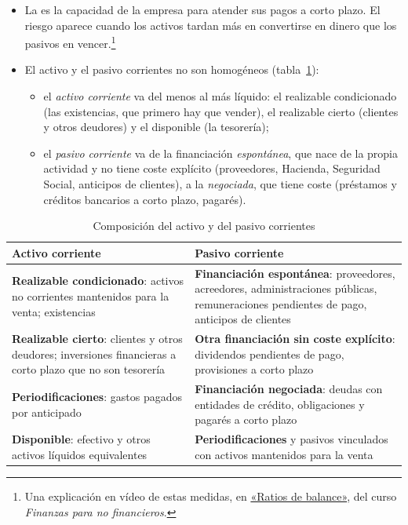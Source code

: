 \documentclass[11pt]{article}
\begin{document}
\begin{itemize}
\item La  es la capacidad de la empresa para atender sus pagos a corto plazo. El riesgo aparece cuando los activos tardan más en convertirse en dinero que los pasivos en vencer.\footnote{Una explicación en vídeo de estas medidas, en \href{https://youtu.be/1lgrALWCkMs}{«Ratios de balance»}, del curso \emph{Finanzas para no financieros}\nocite{GonzalezGarcia2012Ratios}.}
\item El activo y el pasivo corrientes no son homogéneos (tabla~\ref{tab:composicion-corriente}):
  \begin{itemize}
  \item el \emph{activo corriente} va del menos al más líquido: el realizable condicionado (las existencias, que primero hay que vender), el realizable cierto (clientes y otros deudores) y el disponible (la tesorería);
  \item el \emph{pasivo corriente} va de la financiación \emph{espontánea}, que nace de la propia actividad y no tiene coste explícito (proveedores, Hacienda, Seguridad Social, anticipos de clientes), a la \emph{negociada}, que tiene coste (préstamos y créditos bancarios a corto plazo, pagarés).
  \end{itemize}
\end{itemize}

\begin{table}[H]
\centering
\caption{Composición del activo y del pasivo corrientes}\label{tab:composicion-corriente}
\small
\renewcommand{\arraystretch}{1.2}
\begin{tabular}{>{\raggedright\arraybackslash}m{6.9cm}>{\raggedright\arraybackslash}m{6.9cm}}
\toprule
\rowcolor{tceeazulpalido}\textbf{Activo corriente} & \textbf{Pasivo corriente} \\
\midrule
\textbf{Realizable condicionado}: activos no corrientes mantenidos para la venta; existencias & \textbf{Financiación espontánea}: proveedores, acreedores, administraciones públicas, remuneraciones pendientes de pago, anticipos de clientes \\
\textbf{Realizable cierto}: clientes y otros deudores; inversiones financieras a corto plazo que no son tesorería & \textbf{Otra financiación sin coste explícito}: dividendos pendientes de pago, provisiones a corto plazo \\
\textbf{Periodificaciones}: gastos pagados por anticipado & \textbf{Financiación negociada}: deudas con entidades de crédito, obligaciones y pagarés a corto plazo \\
\textbf{Disponible}: efectivo y otros activos líquidos equivalentes & \textbf{Periodificaciones} y pasivos vinculados con activos mantenidos para la venta \\
\bottomrule
\end{tabular}
\end{table}
\end{document}
